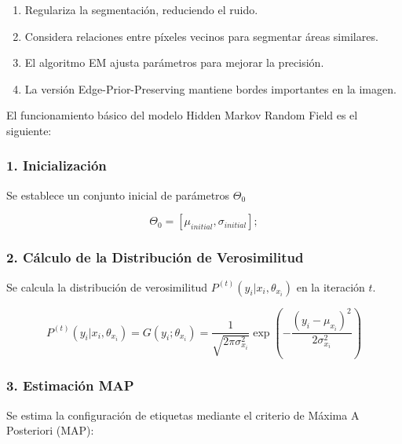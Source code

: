 \begin{enumerate}
\setlength{\itemsep}{-1ex}
   \item{\begin{flushleft} Regulariza la segmentación, reduciendo el ruido. \end{flushleft}}
   \item{\begin{flushleft} Considera relaciones entre píxeles vecinos para segmentar áreas similares. \end{flushleft}}
   \item{\begin{flushleft} El algoritmo EM ajusta parámetros para mejorar la precisión. \end{flushleft}}
   \item{\begin{flushleft} La versión Edge-Prior-Preserving mantiene bordes importantes en la imagen. \end{flushleft}}
\end{enumerate}

El funcionamiento básico del modelo Hidden Markov Random Field es el siguiente:

\subsubsection{1. Inicialización}

Se establece un conjunto inicial de parámetros $\Theta_0$

$$\Theta_0 =[\mu_{initial} ,\sigma_{initial} ];$$

\subsubsection{2. Cálculo de la Distribución de Verosimilitud}

Se calcula la distribución de verosimilitud $P^{(t)} (y_i |x_i ,\theta_{x_i } )$ en la iteración $t$.

$$P^{(t)} (y_i |x_i ,\theta_{x_i } )=G(y_i ;\theta_{x_i } )=\frac{1}{\sqrt{2\pi \sigma_{x_i }^2 }}\exp \left(-\frac{(y_i -\mu_{x_i } )^2 }{2\sigma_{x_i }^2 }\right)$$

\subsubsection{3. Estimación MAP}

Se estima la configuración de etiquetas mediante el criterio de Máxima A Posteriori (MAP):

